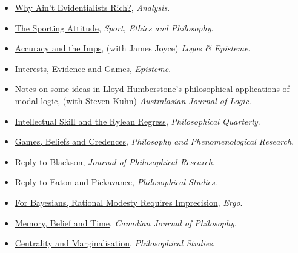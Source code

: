 \documentclass[
  10pt,
  letterpaper,
  DIV=11,
  numbers=noendperiod,
  twoside]{scrartcl}
\providecommand{\tightlist}{%
  \setlength{\itemsep}{0pt}\setlength{\parskip}{0pt}}\usepackage{longtable,booktabs,array}
\begin{document}
\begin{itemize}
\tightlist
\item
  \href{https://brian.weatherson.org/quarto/posts/war-on-war/war-on-war.html}{Why
  Ain't Evidentialists Rich?}, \emph{Analysis}.
\item
  \href{https://brian.weatherson.org/quarto/posts/borge/the-sporting-attitude.html}{The
  Sporting Attitude}, \emph{Sport, Ethics and Philosophy}.
\item
  \href{https://brian.weatherson.org/quarto/posts/imps/accuracy-and-the-imps.html}{Accuracy
  and the Imps}, (with James Joyce) \emph{Logos \& Episteme}.
\item
  \href{https://brian.weatherson.org/quarto/posts/ieg/interests-evidence-and-games.html}{Interests,
  Evidence and Games}, \emph{Episteme}.
\item
  \href{https://brian.weatherson.org/quarto/posts/humberstone-modal/notes-on-some-ideas-in-lloyd-humberstones-philosophical-applications-of-modal-logic.html}{Notes
  on some ideas in Lloyd Humberstone's philosophical applications of
  modal logic}, (with Steven Kuhn) \emph{Australasian Journal of Logic}.
\item
  \href{https://brian.weatherson.org/quarto/posts/ryle-regress/ryle-regress.html}{Intellectual
  Skill and the Rylean Regress}, \emph{Philosophical Quarterly}.
\item
  \href{https://brian.weatherson.org/quarto/posts/gbc/games-beliefs-and-credences.html}{Games,
  Beliefs and Credences}, \emph{Philosophy and Phenomenological
  Research}.
\item
  \href{https://brian.weatherson.org/quarto/posts/reply-blackson/reply-to-blackson.html}{Reply
  to Blackson}, \emph{Journal of Philosophical Research}.
\item
  \href{https://brian.weatherson.org/quarto/posts/reply-eaton-pickavance/reply-to-eaton-and-pickavance.html}{Reply
  to Eaton and Pickavance}, \emph{Philosophical Studies}.
\item
  \href{https://brian.weatherson.org/quarto/posts/modesty/for-bayesians-rational-modesty-requires-imprecision.html}{For
  Bayesians, Rational Modesty Requires Imprecision}, \emph{Ergo}.
\item
  \href{https://brian.weatherson.org/quarto/posts/mbt/memory-belief-and-time.html}{Memory,
  Belief and Time}, \emph{Canadian Journal of Philosophy}.
\item
  \href{https://brian.weatherson.org/quarto/posts/herman/centrality-and-marginalisation.html}{Centrality
  and Marginalisation}, \emph{Philosophical Studies}.

\end{itemize}
\end{document}
